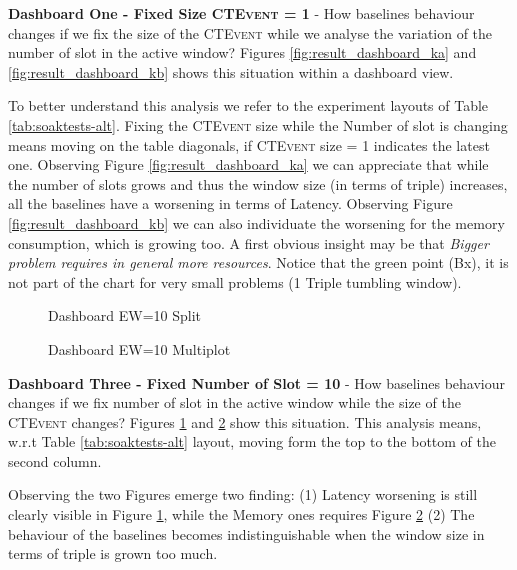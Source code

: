 \textbf{Dashboard One - Fixed Size \textsc{CTEvent} = 1} - How baselines behaviour changes if we fix the size of the \textsc{CTEvent} while we analyse the variation of the number of slot in the active window? Figures \ref{fig:result_dashboard_ka} and \ref{fig:result_dashboard_kb} shows this situation within a dashboard view. 

To better understand this analysis we refer to the experiment layouts of Table \ref{tab:soaktests-alt}. Fixing the \textsc{CTEvent} size while the Number of slot is changing means moving on the table diagonals, if \textsc{CTEvent} size = 1 indicates the latest one.
Observing Figure \ref{fig:result_dashboard_ka} we can appreciate that while the number of slots grows and thus the window size (in terms of triple) increases, all the baselines have a worsening in terms of Latency. Observing Figure \ref{fig:result_dashboard_kb} we can also individuate the worsening for the memory consumption, which is growing too. A first obvious insight may be that \textit{Bigger problem requires in general more resources}. Notice that the green point (Bx), it is not part of the chart for very small problems (1 Triple tumbling window).

\begin{figure}[tbh]
	\centering
	\caption{Dashboard EW=10 Split} 
	\label{fig:result_dashboard_ewa}
\end{figure}

\begin{figure}[tbh]
	\centering
	
	\caption{Dashboard EW=10 Multiplot}
	\label{fig:result_dashboard_ewb}
\end{figure}

\textbf{Dashboard Three - Fixed Number of Slot = 10} - How baselines behaviour changes if we fix number of slot in the active window while the size of the \textsc{CTEvent} changes? Figures \ref{fig:result_dashboard_ewa} and \ref{fig:result_dashboard_ewb} show this situation. This analysis means, w.r.t Table \ref{tab:soaktests-alt} layout, moving form the top to the bottom of the second column.

Observing the two Figures emerge two finding: (1) Latency worsening is still clearly visible in Figure \ref{fig:result_dashboard_ewa}, while the Memory ones requires Figure \ref{fig:result_dashboard_ewb} (2) The behaviour of the baselines becomes indistinguishable when the window size in terms of triple is grown too much. 

